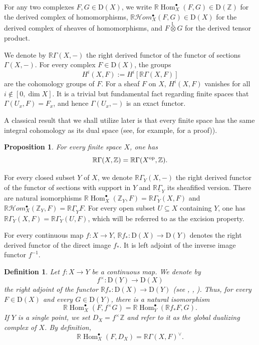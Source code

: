 \documentclass[amssymb,amscd,11pt,20pt]{amsart}
\newcommand{\LL}{{\mathbb L}}
\newcommand{\ZZ}{{\mathbb Z}}
\newcommand{\RR}{\mathbb R}
\newcommand{\0}{\mathbf 0}
\DeclareMathOperator{\Hom}{{Hom}}
\newcommand{\pun}{{\scriptscriptstyle \bullet}}
\newcommand{\HHom}{\mathcal{H}om}
\theoremstyle{plain}
\newtheorem{prop}[thm]{Proposition}
\newtheorem{defn}[thm]{Definition}
\numberwithin{equation}{thm}
\begin{document}
For any two complexes $F,G\in \mathrm{D}(X)$, we write $\RR\Hom_X^\pun(F,G)\in \mathrm{D}(\ZZ)$ for the derived complex of homomorphisms,   $\RR\HHom_X^\pun(F,G)\in \mathrm{D}(X)$ for the derived complex of sheaves of homomorphisms, and $F\overset\LL\otimes G$ for the derived tensor product. 

We denote by    $\RR\Gamma(X,-)$  the right derived functor  of the functor of sections $\Gamma(X,-)$. For every complex $F\in\mathrm{D}(X)$, the groups
\[ H^i(X,F):=H^i[\RR\Gamma(X,F)] \] are the cohomology  groups of $F$. For a sheaf $F$ on $X$, $H^i(X,F)$ vanishes for all $i\notin[0,\dim X]$. It is a trivial but fundamental fact regarding finite spaces that $\Gamma(U_x,F)=F_x$, and hence $\Gamma(U_x,-)$ is an exact functor.

A classical result that we shall utilize later  is that every finite space has the same integral cohomology as  its dual space  (see, for example, \cite[Cor. 4.2.6]{Sanchoetal} for a proof)).
\begin{prop}\label{X=Xop} For every finite space $X$, one has $$\RR\Gamma(X,\ZZ)=\RR\Gamma(X^{\text{\rm op}},\ZZ).$$
\end{prop}

For every closed subset $Y$ of $X$, we  denote $\RR\Gamma_Y(X,-)$ the right derived functor of the functor of sections with support in $Y$ and $\RR\underline\Gamma_Y $ its sheafified version. There are natural isomorphisms $\RR\Hom_X^\pun(\ZZ_Y,F)=\RR\Gamma_Y(X,F)$ and $\RR\HHom_X^\pun(\ZZ_Y,F)=\RR\underline\Gamma_Y F $. For every open subset $U\subseteq X$ containing $Y$, one has $\RR\Gamma_Y(X,F)=\RR\Gamma_Y(U,F)$, which will be referred to as the excision property. 

For every continuous map $f\colon X\to Y$, $\RR f_*\colon \mathrm{D}(X)\to \mathrm{D}(Y)$ denotes the right derived functor  of the direct image $f_*$. It is left adjoint of the inverse image functor $f^{-1}$.

\begin{defn}\label{defglobaldualizing} {\rm Let $f\colon X\to Y$ be a continuous map. We  denote by
\[ f^\times\colon \mathrm{D}(Y)\to \mathrm{D}(X)\]
the right adjoint of the functor $\RR f_*\colon \mathrm{D}(X)\to \mathrm{D}(Y)$ (see \cite{Na}, \cite{Curry}, \cite{Sanchoetal}).  
 Thus, for every $F\in \mathrm{D}(X)$ and every $G\in \mathrm{D}(Y)$, there is a natural isomorphism
\[\RR\Hom_X^\pun(F,f^\times G )=\RR\Hom_Y^\pun(\RR f_*F,G).\] If $Y$ is   a single point, we set $D_X=f^\times\ZZ$ and refer to it as the  {\em global dualizing complex} of $X$. By definition,
\[\RR\Hom_X^\pun(F,D_X)= \RR\Gamma(X,F)^\vee.\]}\end{defn}
\end{document}
